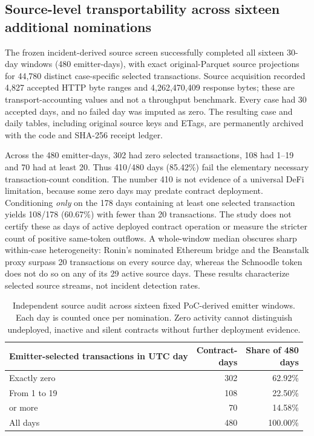 \documentclass[preprint,12pt,authoryear]{elsarticle}
\begin{document}
\subsection{Source-level transportability across sixteen additional nominations}
The frozen incident-derived source screen successfully completed all sixteen 30-day windows (480 emitter-days), with exact original-Parquet source projections for 44,780 distinct case-specific selected transactions. Source acquisition recorded 4,827 accepted HTTP byte ranges and 4,262,470,409 response bytes; these are transport-accounting values and not a throughput benchmark. Every case had 30 accepted days, and no failed day was imputed as zero. The resulting case and daily tables, including original source keys and ETags, are permanently archived with the code and SHA-256 receipt ledger.

Across the 480 emitter-days, 302 had zero selected transactions, 108 had 1--19 and 70 had at least 20. Thus 410/480 days (85.42\%) fail the elementary necessary transaction-count condition. The number 410 is not evidence of a universal DeFi limitation, because some zero days may predate contract deployment. Conditioning \emph{only} on the 178 days containing at least one selected transaction yields 108/178 (60.67\%) with fewer than 20 transactions. The study does not certify these as days of active deployed contract operation or measure the stricter count of positive same-token outflows. A whole-window median obscures sharp within-case heterogeneity: Ronin's nominated Ethereum bridge and the Beanstalk proxy surpass 20 transactions on every source day, whereas the Schnoodle token does not do so on any of its 29 active source days. These results characterize selected source streams, not incident detection rates.

\begin{table}[htbp]
\centering\small
\caption{Independent source audit across sixteen fixed PoC-derived emitter windows. Each day is counted once per nomination. Zero activity cannot distinguish undeployed, inactive and silent contracts without further deployment evidence.}
\label{tab:newframe}
\begin{tabularx}{\linewidth}{@{}>{\raggedright\arraybackslash}X r r@{}}
\toprule
Emitter-selected transactions in UTC day & \shortstack{Contract-\\days} & \shortstack{Share of 480\\days}\\
\midrule
Exactly zero & 302 & 62.92\%\\
From 1 to 19 & 108 & 22.50\%\\
20 or more & 70 & 14.58\%\\
\midrule
All days & 480 & 100.00\%\\
\bottomrule
\end{tabularx}
\end{table}
\end{document}
